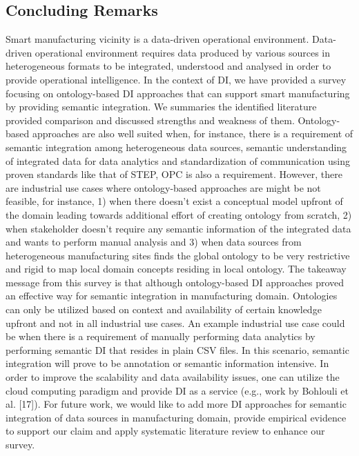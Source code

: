\subsection{Concluding Remarks} 
Smart manufacturing vicinity is a data-driven operational environment. Data-driven operational environment requires data produced by various sources in heterogeneous formats to be integrated, understood and analysed in order to provide operational intelligence. In the context of DI, we have provided a survey focusing on ontology-based DI approaches that can support smart manufacturing by providing semantic integration. We summaries the identified literature provided comparison and discussed strengths and weakness of them. Ontology-based approaches are also well suited when, for instance, there is a requirement of semantic integration among heterogeneous data sources, semantic understanding of integrated data for data analytics and standardization of communication using proven standards like that of STEP, OPC is also a requirement. 
However, there are industrial use cases where ontology-based approaches are might be not feasible, for instance, 1) when there doesn’t exist a conceptual model upfront of the domain leading towards additional effort of creating ontology from scratch, 2) when stakeholder doesn’t require any semantic information of the integrated data and wants to perform manual analysis and 3) when data sources from heterogeneous manufacturing sites finds the global ontology to be very restrictive and rigid to map local domain concepts residing in local ontology. 
The takeaway message from this survey is that although ontology-based DI approaches proved an effective way for semantic integration in manufacturing domain. Ontologies can only be utilized based on context and availability of certain knowledge upfront and not in all industrial use cases. An example industrial use case could be when there is a requirement of manually performing data analytics by performing semantic DI that resides in plain CSV files. In this scenario, semantic integration will prove to be annotation or semantic information intensive. 
In order to improve the scalability and data availability issues, one can utilize the cloud computing paradigm and provide DI as a service (e.g., work by Bohlouli et al. [17]).  
For future work, we would like to add more DI approaches for semantic integration of data sources in manufacturing domain, provide empirical evidence to support our claim and apply systematic literature review to enhance our survey.